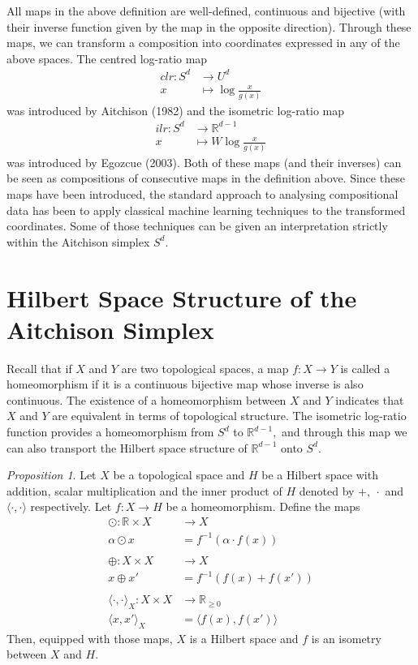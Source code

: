 \documentclass[BSc]{usydthesis}
\numberwithin{equation}{chapter}
\theoremstyle{remark}
\newtheorem{Proposition}[equation]{Proposition}
\begin{document}
All maps in the above definition are well-defined, continuous and bijective (with their inverse function given by the map in the opposite direction). Through these maps, we can transform a composition into coordinates expressed in any of the above spaces. The centred log-ratio map 
\begin{align*}
 clr : S^d &\to U^d \\
    x &\mapsto \log \frac{x}{g(x)}
\end{align*} 
was introduced by Aitchison (1982) and the isometric log-ratio map 
\begin{align*}
 ilr : S^d &\to \mathbb{R}^{d-1} \\
    x &\mapsto W \log \frac{x}{g(x)}
\end{align*}
was introduced by Egozcue (2003). Both of these maps (and their inverses) can be seen as compositions of consecutive maps in the definition above. Since these maps have been introduced, the standard approach to analysing compositional data has been to apply classical machine learning techniques to the transformed coordinates. Some of those techniques can be given an interpretation strictly within the Aitchison simplex $S^d.$


\section{Hilbert Space Structure of the Aitchison Simplex}
Recall that if $X$ and $Y$ are two topological spaces, a map $f:X\to Y$ is called a homeomorphism if it is a continuous bijective map whose inverse is also continuous. The existence of a homeomorphism between $X$ and $Y$ indicates that $X$ and $Y$ are equivalent in terms of topological structure. The isometric log-ratio function provides a homeomorphism from $S^d$ to $\mathbb{R}^{d-1},$ and through this map we can also transport the Hilbert space structure of $\mathbb{R}^{d-1}$ onto $S^d.$ 

\begin{Proposition}
 Let $X$ be a topological space and $H$ be a Hilbert space with addition, scalar multiplication and the inner product of $H$ denoted by $+,\  \cdot$ and $ \langle \cdot, \cdot \rangle$ respectively. Let $f: X \to H$ be a homeomorphism. Define the maps
\begin{align*}
 \odot : \mathbb{R} \times X &\to X \\
    \alpha \odot x &= f^{-1}( \alpha \cdot f(x) )\\
    \ \\
 \oplus : X \times X &\to X \\
    x \oplus x' &= f^{-1}( f(x) + f(x'))\\
    \ \\
 \langle \cdot, \cdot \rangle_X : X \times X &\to \mathbb{R}_{\geq 0} \\
    \langle x, x' \rangle_X &= \langle f(x), f(x') \rangle
\end{align*}
Then, equipped with those maps, $X$ is a Hilbert space and $f$ is an isometry between $X$ and $H.$
\end{Proposition}
\end{document}
